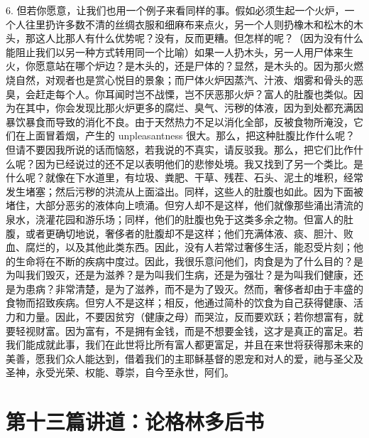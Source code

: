 6. 但若你愿意，让我们也用一个例子来看同样的事。假如必须生起一个火炉，一个人往里扔许多数不清的丝绸衣服和细麻布来点火，另一个人则扔橡木和松木的木头，那这人比那人有什么优势呢？没有，反而更糟。但怎样的呢？（因为没有什么能阻止我们以另一种方式转用同一个比喻）如果一人扔木头，另一人用尸体来生火，你愿意站在哪个炉边？是木头的，还是尸体的？显然，是木头的。因为那火燃烧自然，对观者也是赏心悦目的景象；而尸体火炉因蒸汽、汁液、烟雾和骨头的恶臭，会赶走每个人。你耳闻时岂不战慄，岂不厌恶那火炉？富人的肚腹也类似。因为在其中，你会发现比那火炉更多的腐烂、臭气、污秽的体液，因为到处都充满因暴饮暴食而导致的消化不良。由于天然热力不足以消化全部，反被食物所淹没，它们在上面冒着烟，产生的 unpleasantness 很大。那么，把这种肚腹比作什么呢？但请不要因我所说的话而恼怒，若我说的不真实，请反驳我。那么，把它们比作什么呢？因为已经说过的还不足以表明他们的悲惨处境。我又找到了另一个类比。是什么呢？就像在下水道里，有垃圾、粪肥、干草、残茬、石头、泥土的堆积，经常发生堵塞；然后污秽的洪流从上面溢出。同样，这些人的肚腹也如此。因为下面被堵住，大部分恶劣的液体向上喷涌。但穷人却不是这样，他们就像那些涌出清流的泉水，浇灌花园和游乐场；同样，他们的肚腹也免于这类多余之物。但富人的肚腹，或者更确切地说，奢侈者的肚腹却不是这样；他们充满体液、痰、胆汁、败血、腐烂的，以及其他此类东西。因此，没有人若常过奢侈生活，能忍受片刻；他的生命将在不断的疾病中度过。因此，我很乐意问他们，肉食是为了什么目的？是为叫我们毁灭，还是为滋养？是为叫我们生病，还是为强壮？是为叫我们健康，还是为患病？非常清楚，是为了滋养，而不是为了毁灭。然而，奢侈者却由于丰盛的食物而招致疾病。但穷人不是这样；相反，他通过简朴的饮食为自己获得健康、活力和力量。因此，不要因贫穷（健康之母）而哭泣，反而要欢跃；若你想富有，就要轻视财富。因为富有，不是拥有金钱，而是不想要金钱，这才是真正的富足。若我们能成就此事，我们在此世将比所有富人都更富足，并且在来世将获得那未来的美善，愿我们众人能达到，借着我们的主耶稣基督的恩宠和对人的爱，祂与圣父及圣神，永受光荣、权能、尊崇，自今至永世，阿们。\par



\section{第十三篇讲道：论格林多后书}

